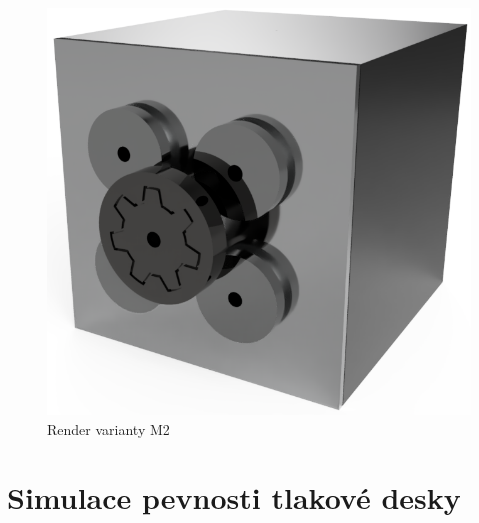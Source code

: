 \begin{figure}[htbp]
    \centering
    \includegraphics[width=\textwidth]{kapitoly/obrazky/M2/predni_render.PNG}
    \caption{Render varianty M2}
    \label{fig:M2-render}
\end{figure}

\section*{Simulace pevnosti tlakové desky}

